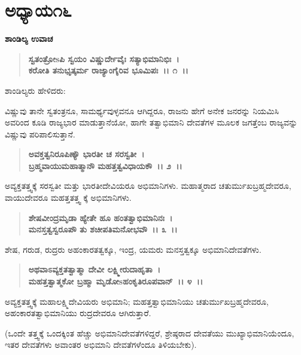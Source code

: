 \newpage

\section*{ಅಧ್ಯಾಯ೧೬}

\emptypage

\begin{flushleft}
\textbf{ಶಾಂಡಿಲ್ಯ ಉವಾಚ }
\end{flushleft}

\begin{verse}
\textbf{ಸ್ವತಂತ್ರೋsಪಿ ಸ್ವಯಂ ವಿಷ್ಣುರ್ದೇವೈಃ ಸತ್ಯಾಭಿಮಾನಿಭಿಃ~।}\\\textbf{ಕರೋತಿ ತನುಭೃತ್ಕರ್ಮ ರಾಜ್ಯಾಂಗೈರಿವ ಭೂಮಿಪಃ~।। ೧~।।}
\end{verse}

\begin{flushleft}
ಶಾಂಡಿಲ್ಯರು ಹೇಳಿದರು:
\end{flushleft}

ವಿಷ್ಣುವು ತಾನೇ ಸ್ವತಂತ್ರನೂ, ಸಾಮರ್ಥ್ಯವುಳ್ಳವನೂ ಆಗಿದ್ದರೂ, ರಾಜನು ಹೇಗೆ ಅನೇಕ ಜನರನ್ನು ನಿಯಮಿಸಿ ಅವರಿಂದ ಕೂಡಿ ರಾಜ್ಯಭಾರ ಮಾಡುತ್ತಾನೆಯೋ, ಹಾಗೇ ತತ್ವಾಭಿಮಾನಿ ದೇವತೆಗಳ ಮೂಲಕ ಜಗತ್ತೆಂಬ ರಾಜ್ಯವನ್ನು ವಿಷ್ಣುವು ಪರಿಪಾಲಿಸುತ್ತಾನೆ.

\begin{verse}
\textbf{ಅವಕ್ತತ್ವನಿರೂಪಿಣ್ಯೌ ಭಾರತೀ ಚ ಸರಸ್ವತೀ~।}\\\textbf{ಬ್ರಹ್ಮವಾಯುಮಹಾತ್ಮಾನೌ ಮಹತ್ತತ್ವವಿಧಾಯಕೌ~।। ೨~।।}
\end{verse}

ಅವ್ಯಕ್ತತತ್ತ್ವಕ್ಕೆ ಸರಸ್ವತೀ ಮತ್ತು ಭಾರತೀದೇವಿಯರೂ ಅಭಿಮಾನಿಗಳು. ಮಹಾತ್ಮರಾದ ಚತುರ್ಮುಖಬ್ರಹ್ಮದೇವರೂ, ವಾಯುದೇವರೂ ಮಹತ್ತತತ್ತ್ವ ಕ್ಕೆ ಅಭಿಮಾನಿಗಳು.

\begin{verse}
\textbf{ಶೇಷವೀಂದ್ರಮೃಡಾ ಹ್ಯೇತೇ ಹೂ ಹಂತತ್ವಾಭಿಮಾನಿನಃ~।}\\\textbf{ಮನಸ್ತತ್ವಸ್ವರೂಪೌ ತು ಶಚೀಪತಿಮನೋಭವೌ~।। ೩~।।}
\end{verse}

ಶೇಷ, ಗರುಡ, ರುದ್ರರು ಅಹಂಕಾರತತ್ವಕ್ಕೂ, ಇಂದ್ರ, ಯಮರು ಮನಸ್ತತ್ವಕ್ಕೂ ಅಭಿಮಾನಿದೇವತೆಗಳು.

\begin{verse}
\textbf{ಅಥವಾಽವ್ಯಕ್ತತತ್ವಾತ್ಮಾ ದೇವೀ ಲಕ್ಷ್ಮೀರುದಾಹೃತಾ~।}\\\textbf{ಮಹತ್ತತ್ವಾತ್ಮಕೋ ಬ್ರಹ್ಮಾ ಮೃಡೋsಹಂಕೃತಿರೂಪವಾನ್~।। ೪~।।}
\end{verse}

ಅವ್ಯಕ್ತತತ್ತ್ವಕ್ಕೆ ಮಹಾಲಕ್ಷ್ಮಿದೇವಿಯರು ಅಭಿಮಾನಿ; ಮಹತ್ತತ್ವಾಭಿಮಾನಿಯು ಚತು\-ರ್ಮುಖಬ್ರಹ್ಮದೇವರೂ, ಅಹಂಕಾರತತ್ವಾಭಿಮಾನಿಯು ರುದ್ರದೇವರೂ ಆಗಿರುತ್ತಾರೆ.

(ಒಂದೇ ತತ್ತ್ವಕ್ಕೆ ಒಂದಕ್ಕಿಂತ ಹೆಚ್ಚು ಅಭಿಮಾನಿದೇವತೆಗಳಿದ್ದರೆ, ಶ್ರೇಷ್ಠರಾದ ದೇವತೆಯು ಮುಖ್ಯಾಭಿಮಾನಿಯೆಂದೂ, ಇತರ ದೇವತೆಗಳು ಅವಾಂತರ ಅಭಿಮಾನಿ ದೇವತೆಗಳೆಂದೂ ತಿಳಿಯಬೇಕು).

